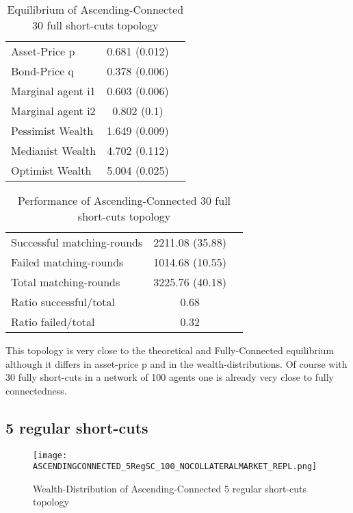 \documentclass[Bachelorarbeit.tex]{subfiles}
\begin{document}
\begin{table}[H]
	\caption{Equilibrium of Ascending-Connected 30 full short-cuts topology}
	\centering
	\begin{tabular} { l c r }
		\hline
		Asset-Price p & 0.681 (0.012) \\
		Bond-Price q & 0.378 (0.006) \\
		Marginal agent i1 & 0.603 (0.006) \\
		Marginal agent i2 & 0.802 (0.1) \\
		\hline
		Pessimist Wealth & 1.649 (0.009) \\
		Medianist Wealth & 4.702 (0.112) \\
		Optimist Wealth & 5.004 (0.025) \\
		\hline
	\end{tabular}
\end{table} 

\begin{table}[H]
	\caption{Performance of Ascending-Connected 30 full short-cuts topology}
	\centering
	\begin{tabular} { l c r }
		\hline
		Successful matching-rounds& 2211.08 (35.88) \\
		Failed matching-rounds & 1014.68 (10.55) \\
		Total matching-rounds & 3225.76 (40.18) \\
		\hline
		Ratio successful/total & 0.68 \\
		Ratio failed/total & 0.32 \\
		\hline
	\end{tabular}
\end{table}

This topology is very close to the theoretical and Fully-Connected equilibrium although it differs in asset-price p and in the wealth-distributions. Of course with 30 fully short-cuts in a network of 100 agents one is already very close to fully connectedness.

\subsection{5 regular short-cuts}
\begin{figure}[H]
	\centering
  \texttt{[image: ASCENDINGCONNECTED\_5RegSC\_100\_NOCOLLATERALMARKET\_REPL.png]}
	\caption{Wealth-Distribution of Ascending-Connected 5 regular short-cuts topology}
	\label{fig:wealth_ASCENDINGCONNECTED_5RegSC_100_NOCOLLATERALMARKET_REPL}
\end{figure}
\end{document}
